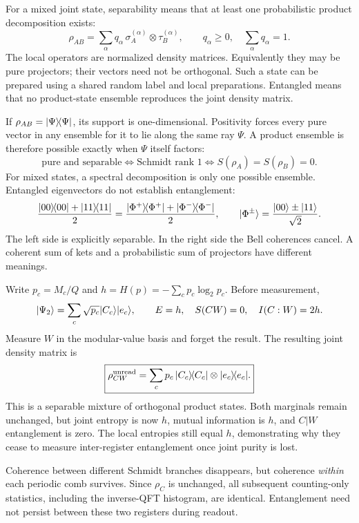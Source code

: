 For a mixed joint state, separability means that at least one probabilistic product decomposition exists:
\[
\rho_{AB}=\sum_\alpha q_\alpha\,
\sigma_A^{(\alpha)}\otimes\tau_B^{(\alpha)},
\qquad q_\alpha\ge0,\quad\sum_\alpha q_\alpha=1.
\]
The local operators are normalized density matrices. Equivalently they may be pure projectors; their vectors need not be orthogonal. Such a state can be prepared using a shared random label and local preparations. Entangled means that no product-state ensemble reproduces the joint density matrix.

If \(\rho_{AB}=\lvert\Psi\rangle\!\langle\Psi\rvert\), its support is one-dimensional. Positivity forces every pure vector in any ensemble for it to lie along the same ray \(\Psi\). A product ensemble is therefore possible exactly when \(\Psi\) itself factors:
\[
\text{pure and separable}\iff
\text{Schmidt rank }1\iff S(\rho_A)=S(\rho_B)=0.
\]
For mixed states, a spectral decomposition is only one possible ensemble. Entangled eigenvectors do not establish entanglement:
\[
\frac{\lvert00\rangle\!\langle00\rvert+\lvert11\rangle\!\langle11\rvert}2
=\frac{\lvert\Phi^+\rangle\!\langle\Phi^+\rvert+\lvert\Phi^-\rangle\!\langle\Phi^-\rvert}2,
\qquad
\lvert\Phi^\pm\rangle=\frac{\lvert00\rangle\pm\lvert11\rangle}{\sqrt2}.
\]
The left side is explicitly separable. In the right side the Bell coherences cancel. A coherent sum of kets and a probabilistic sum of projectors have different meanings.

Write \(p_c=M_c/Q\) and \(h=H(p)=-\sum_cp_c\log_2p_c\). Before measurement,
\[
\lvert\Psi_2\rangle=\sum_c\sqrt{p_c}\lvert C_c\rangle\lvert e_c\rangle,
\qquad E=h,\quad S(CW)=0,\quad I(C:W)=2h.
\]
Measure \(W\) in the modular-value basis and forget the result. The resulting joint density matrix is
\[
\boxed{\rho^{\rm unread}_{CW}
=\sum_cp_c\,\lvert C_c\rangle\!\langle C_c\rvert\otimes\lvert e_c\rangle\!\langle e_c\rvert.}
\]
This is a separable mixture of orthogonal product states. Both marginals remain unchanged, but joint entropy is now \(h\), mutual information is \(h\), and \(C|W\) entanglement is zero. The local entropies still equal \(h\), demonstrating why they cease to measure inter-register entanglement once joint purity is lost.

Coherence between different Schmidt branches disappears, but coherence \emph{within} each periodic comb survives. Since \(\rho_C\) is unchanged, all subsequent counting-only statistics, including the inverse-QFT histogram, are identical. Entanglement need not persist between these two registers during readout.

